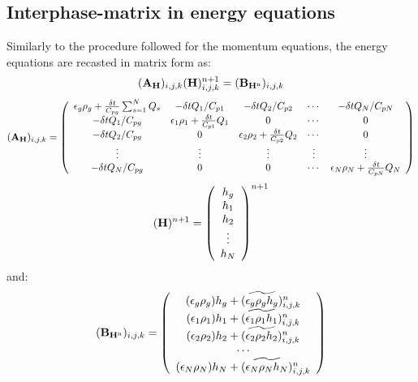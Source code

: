 \subsection{Interphase-matrix in energy equations}

Similarly to the procedure followed for the momentum equations, the energy equations
are recasted in matrix form as:
%
\begin{eqnarray}
\htmlimage{}
({\bf A_H})_{i,j,k} ({\bf H})_{i,j,k}^{n+1} = ({\bf B_{H^{\rm n}}})_{i,j,k}
\nonumber
\end{eqnarray}
%
\begin{eqnarray}
({\bf A_H})_{i,j,k} = \left ( \begin{array}{ccccc}
\epsilon_g \rho_g + \frac{\delta t}{C_{pg}} \sum_{s=1}^{N} Q_s & -\delta t Q_1/ C_{p1} & -\delta t Q_2/ C_{p2}  & \cdots & -\delta t Q_N/ C_{pN} \\
-\delta t Q_1/ C_{pg} & \epsilon_1 \rho_1 + \frac{\delta t}{C_{p1}} Q_{1} & 0 & \cdots & 0  \\
-\delta t Q_2/ C_{pg} & 0 & \epsilon_2 \rho_2 + \frac{\delta t}{C_{p2}} Q_{2} & \cdots & 0  \\
\vdots  & \vdots  & \vdots  & \vdots  & \vdots   \\
-\delta t Q_N/ C_{pg} &  0  &  0  &  \cdots   & \epsilon_N \rho_N + \frac{\delta t}{C_{pN}} Q_{N}
\end{array} \right )
\nonumber
\end{eqnarray}
%
\begin{eqnarray}
\htmlimage{}
({\bf H})^{n+1} =  \left( \begin{array}{c}
h_g \\
h_1 \\
h_2 \\
\vdots \\
h_N \end{array} \right )^{n+1} 
\nonumber
\end{eqnarray}
%
and:
%
\begin{eqnarray}
\htmlimage{}
({\bf B_{H^{\rm n}}})_{i,j,k}=  \left ( \begin{array}{c}
(\epsilon_g \rho_g) h_g + (\widetilde{\epsilon_g \rho_g h_g})^n_{i,j,k} \\
(\epsilon_1 \rho_1) h_1 + (\widetilde{\epsilon_1 \rho_1 h_1})^n_{i,j,k} \\
(\epsilon_2 \rho_2) h_2 + (\widetilde{\epsilon_2 \rho_2 h_2})^n_{i,j,k} \\
\cdots \\
(\epsilon_N \rho_N) h_N + (\widetilde{\epsilon_N \rho_N h_N})^n_{i,j,k} \\
\end{array} \right )
\nonumber
\end{eqnarray}
%
\newpage

%
\clearpage

